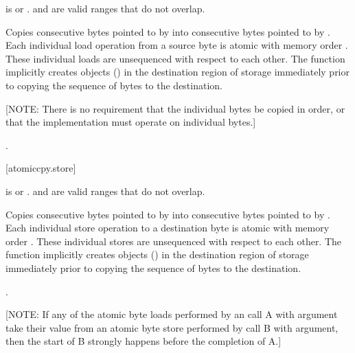 \begin{itemdescr}
\pnum
\expects

 is  or
. \tcode{(char*)dest + [0, count)}
and \tcode{(const char*)source + [0, count)} are valid ranges
that do not overlap.

\pnum
\effects
Copies  consecutive bytes pointed to by
 into consecutive bytes pointed to by . Each
individual load operation from a source byte is atomic with memory order
. These individual loads are unsequenced with respect to
each other. The function implicitly creates objects ()
in the destination region of storage immediately prior to copying the
sequence of bytes to the destination. 

[NOTE: There is no requirement
that the individual bytes be copied in order, or that the implementation
must operate on individual bytes.]%

\pnum
\returns
{}.
\end{itemdescr}

[atomiccpy.store]{}
\textbf{}

\begin{itemdescr}
\pnum
\expects
{} is  or
. \tcode{(char*)dest + [0, count)}
and \tcode{(const char*)source + [0, count)} are valid ranges
that do not overlap.

\pnum
\effects
Copies  consecutive bytes pointed to by
 into consecutive bytes pointed to by . Each
individual store operation to a destination byte is atomic with memory
order . These individual stores are unsequenced with
respect to each other. The function implicitly creates objects
() in the destination region of storage immediately
prior to copying the sequence of bytes to the destination.

\pnum
\returns

.
\end{itemdescr}

[NOTE: If any of the atomic byte loads performed by an
 call A with
 argument take their value from an atomic
byte store performed by  call
B with  argument, then the start of B
strongly happens before the completion of A.]%
